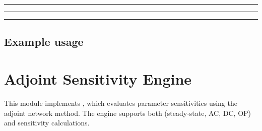 \documentclass[letterpaper,10pt,english]{sphinxmanual}
\begin{document}
\bigskip\hrule\bigskip



\bigskip\hrule\bigskip



\bigskip\hrule\bigskip



\section{Example usage}
\label{\detokenize{dc_engine:example-usage}}
\begin{sphinxVerbatim}[commandchars=\\\{\}]
 
 

    
   
        
\end{sphinxVerbatim}

\sphinxstepscope


\chapter{Adjoint Sensitivity Engine}
\label{\detokenize{adjoint_engine:adjoint-sensitivity-engine}}\label{\detokenize{adjoint_engine:adjoint-engine-module}}\label{\detokenize{adjoint_engine::doc}}
\sphinxAtStartPar
This module implements {\hyperref[\detokenize{adjoint_engine:AdjointEngine}]{}}, which evaluates parameter sensitivities using the adjoint network method.
The engine supports both  (steady‑state, AC, DC, OP) and  sensitivity calculations.
\end{document}
